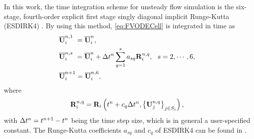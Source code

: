 In this work, the time integration scheme for unsteady flow simulation is the six-stage, fourth-order explicit first stage singly diagonal implicit Runge-Kutta (ESDIRK4) \cite{bijl2002implicitBDFvESDIRK}. By using this method, \eqref{eq:FVODECell} is integrated in time as
\begin{subequations}\label{eq:ESDIRK4}
		 \begin{align}
			&\overline{\mathbf{U}}^{n,1}_i \ = \overline{\mathbf{U}}^{n}_i, \label{eq:esdirk4-1}\\        
			&\overline{\mathbf{U}}^{n,s}_i \ = \overline{\mathbf{U}}^{n}_i + \mathrm\Delta t^n \sum_{q=1}^{s} a_{sq} \mathbf{R}_i^{n,q},\ \ s = 2, \cdots, 6, \label{eq:esdirk4-s} \\
			&\overline{\mathbf{U}}^{n+1}_i = \overline{\mathbf{U}}^{n,6}_i, \label{eq:esdirk4-6}
		\end{align}
\end{subequations}
where
\begin{equation}
	\mathbf{R}^{n,q}_i  = \mathbf{R}_i \left(t^n + c_q \mathrm\Delta t^n, \left\{\mathbf{U}^{n,q}_j\right\}_{j \in S_i}\right),
\end{equation}
with $\mathrm\Delta t^n= t^{n+1} - t^n$ being the time step size, which is in general a user-specified constant.
The Runge-Kutta coefficients $a_{sq}$ and $c_q$ of ESDIRK4 can be found
in \cite{bijl2002implicitBDFvESDIRK}.

